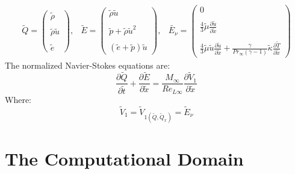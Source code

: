 \documentclass[11pt, a4paper]{article}
\newcommand{\parder}[2]{\frac{\partial {#1}}{\partial {#2}}}
\begin{document}
\begin{equation}
    \begin{matrix}
        \tilde{Q}=\begin{pmatrix}
        \tilde{\rho} \\\\
        \tilde{\rho}\tilde{u} \\\\
        \tilde{e}
        \end{pmatrix}, & \tilde{E}=\begin{pmatrix}
        \tilde{\rho}\tilde{u} \\\\
        \tilde{p}+\tilde{\rho}\tilde{u}^2 \\\\
        \left(\tilde{e}+\tilde{p}\right)\tilde{u}
        \end{pmatrix}, & \tilde{E_\nu}=\begin{pmatrix}
        0 \\\\
        \displaystyle\frac{4}{3}\tilde{\mu} \parder{\tilde{u}}{\tilde{x}} \\\\
        \displaystyle\frac{4}{3}\tilde{\mu}\tilde{u}\parder{\tilde{u}}{\tilde{x}}+\frac{\gamma}{Pr_\infty\left(\gamma-1\right)}\tilde{\kappa}\parder{\tilde{T}}{\tilde{x}}
        \end{pmatrix}
    \end{matrix}
\end{equation}
The normalized Navier-Stokes equations are:
\begin{equation}
    \parder{\tilde{Q}}{\tilde{t}}+\parder{\tilde{E}}{\tilde{x}}=\frac{M_\infty}{Re_{L\infty}}\parder{\tilde{V}_1}{\tilde{x}}
    \label{eq: normalized N-S}
\end{equation}
Where:
\begin{equation*}
    \tilde{V}_1=\tilde{V}_{1\left(\tilde{Q},\tilde{Q}_x\right)}=\tilde{E}_\nu
\end{equation*}

\section{The Computational Domain}
\end{document}
